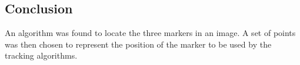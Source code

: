 \subsection{Conclusion}
An algorithm was found to locate the three markers in an image.
A set of points was then chosen to represent the position of the marker to be used by the tracking algorithms.




